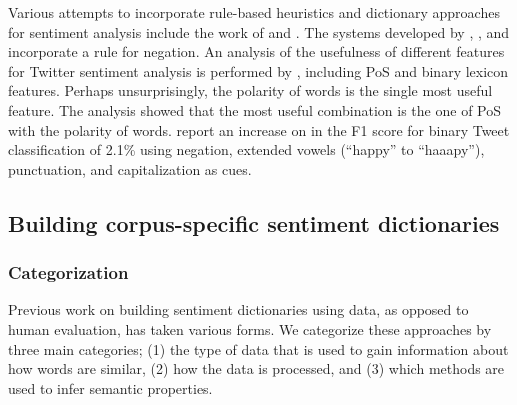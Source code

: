{Various attempts to incorporate rule-based heuristics and dictionary approaches for sentiment analysis include the work of \cite{thelwall2012sentiment} and \cite{hutto2014vader}.
The systems developed by \cite{kiritchenko2014sentiment}, \cite{wilson2005recognizing}, and \cite{polanyi2006contextual} incorporate a rule for negation.
An analysis of the usefulness of different features for Twitter sentiment analysis is performed by \cite{agarwal2011sentiment}, including PoS and binary lexicon features.
Perhaps unsurprisingly, the polarity of words is the single most useful feature.
The analysis showed that the most useful combination is the one of PoS with the polarity of words.
\cite{hutto2014vader} report an increase on in the F1 score for binary Tweet classification of 2.1\% using negation, extended vowels (``happy'' to ``haaapy''), punctuation, and capitalization as cues.



\subsection{Building corpus-specific sentiment dictionaries}

\subsubsection{Categorization}

Previous work on building sentiment dictionaries using data, as opposed to human evaluation, has taken various forms.
We categorize these approaches by three main categories; (1) the type of data that is used to gain information about how words are similar, (2) how the data is processed, and (3) which methods are used to infer semantic properties.\\

}
